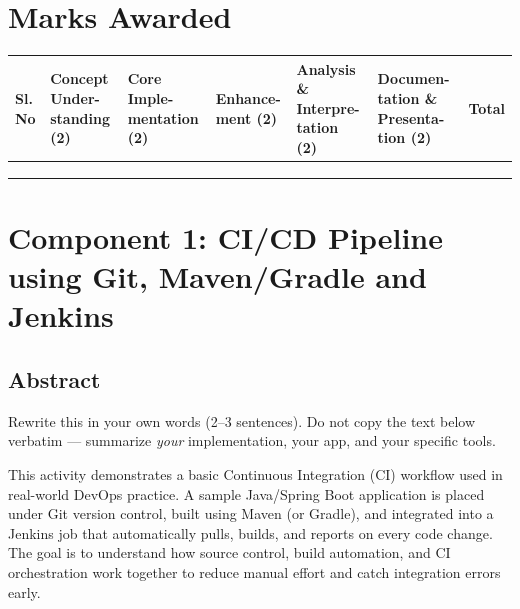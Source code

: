 \documentclass[12pt,a4paper]{article}
\newcommand{\sizeTwelve}{\fontsize{12pt}{14.5pt}\selectfont}  %
\begin{document}
\section*{Marks Awarded}

\vspace{0.3cm}

{\sizeTwelve
\setlength{\tabcolsep}{3pt}
\renewcommand{\arraystretch}{1.5}
\begin{longtable}{|>{\centering\arraybackslash}p{1.0cm}|>{\raggedright\arraybackslash}p{2.2cm}|>{\raggedright\arraybackslash}p{2.2cm}|>{\raggedright\arraybackslash}p{2.0cm}|>{\raggedright\arraybackslash}p{2.3cm}|>{\raggedright\arraybackslash}p{2.5cm}|>{\centering\arraybackslash}p{1.4cm}|}
\hline
\textbf{Sl. No} &
\textbf{Concept Under- standing (2)} &
\textbf{Core Imple- mentation (2)} &
\textbf{Enhance- ment (2)} &
\textbf{Analysis \& Interpre- tation (2)} &
\textbf{Documen- tation \& Presenta- tion (2)} &
\textbf{Total} \\
\hline
\parbox[c][1.1cm][c]{1.0cm}{} & & & & & & \\
\hline
\parbox[c][1.1cm][c]{1.0cm}{} & & & & & & \\
\hline
{} &
\parbox[c][1.1cm][c]{1.4cm}{\centering} \\
\hline
\end{longtable}
\par}

\newpage

\section*{Component 1: CI/CD Pipeline using Git, Maven/Gradle and Jenkins}

\subsection*{Abstract}
\begin{studentnote}
Rewrite this in your own words (2--3 sentences). Do not copy the text below verbatim --- summarize \textit{your} implementation, your app, and your specific tools.
\end{studentnote}

This activity demonstrates a basic Continuous Integration (CI) workflow used in real-world DevOps practice. A sample Java/Spring Boot application is placed under Git version control, built using Maven (or Gradle), and integrated into a Jenkins job that automatically pulls, builds, and reports on every code change. The goal is to understand how source control, build automation, and CI orchestration work together to reduce manual effort and catch integration errors early.
\end{document}
